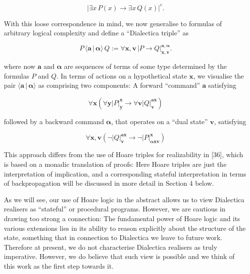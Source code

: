 \documentclass[10pt,a4paper]{article}
\begin{document}
\par  \quad  \[|{\exists x\,P(x)\to\exists x\,Q(x)}|^{c}.\]\quad  \quad  
  
With this loose correspondence in mind, we now generalise to formulas of arbitrary logical complexity and define a “Dialectica triple” as\par
  
\par  \quad  \[{P}\,{\langle{\bm{a}}\,|\,{\bm{\alpha}}\rangle}\,{Q}:=\forall\bm{x},\bm{v}\,|{P\to Q}|^{\bm{a},\bm{\alpha}}_{\bm{x},\bm{v}}.\]\quad  \quad  
  
where now $\bm{a}$ and $\bm{\alpha}$ are sequences of terms of some type determined by the formulas $P$ and $Q$. In terms of actions on a hypothetical state $\bm{x}$, we visualise the pair $\langle{\bm{a}}\,|\,{\bm{\alpha}}\rangle$ as comprising two components: A forward “command” $\bm{a}$ satisfying\par
  
\par  \quad  \[\forall\bm{x}\left(\forall\bm{y}|{P}|^{\bm{x}}_{\bm{y}}\to\forall\bm{v}|{Q}|^{\bm{a}\bm{x}}_{\bm{v}}\right)\]\quad  \quad  
  
followed by a backward command $\bm{\alpha}$, that operates on a “dual state” $\bm{v}$, satisfying\par
  
\par  \quad  \[\forall\bm{x},\bm{v}\left(\neg|{Q}|^{\bm{a}\bm{x}}_{\bm{v}}\to\neg|{P}|^{\bm{x}}_{\bm{\alpha}\bm{x}\bm{v}}\right)\]\quad  \quad  
  
This approach differs from the use of Hoare triples for realizability in [36], which is based on a monadic translation of proofs: Here Hoare triples are just the interpretation of implication, and a corresponding stateful interpretation in terms of backpropagation will be discussed in more detail in Section 4 below.\par
 
 
 
As we will see, our use of Hoare logic in the abstract allows us to view Dialectica realisers as “stateful” or procedural programs. However, we are cautious in drawing too strong a connection: The fundamental power of Hoare logic and its various extensions lies in its ability to reason explicitly about the structure of the state, something that in connection to Dialectica we leave to future work. Therefore at present, we do not characterise Dialectica realisers as truly imperative. However, we do believe that such view is possible and we think of this work as the first step towards it.\par
 
\end{document}
